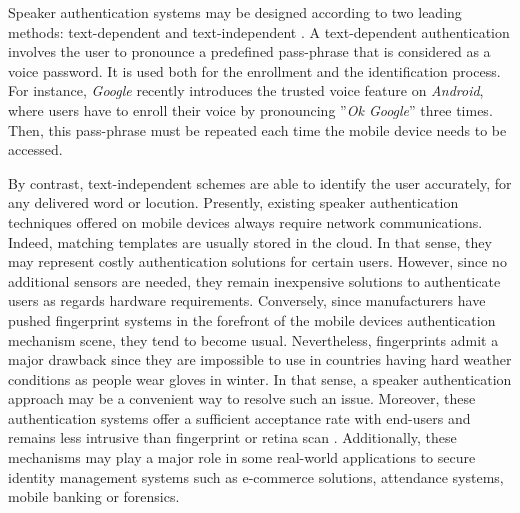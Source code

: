 \documentclass[cryptography,article,submit,moreauthors,pdftex,10pt,a4paper]{mdpi}
\begin{document}
Speaker authentication systems may be designed according to two leading methods: text-dependent and text-independent \cite{15,16}. A text-dependent authentication involves the user to pronounce a predefined pass-phrase that is considered as a voice password. It is used both for the enrollment and the identification process. For instance, \textit{Google} recently introduces the trusted voice feature on \textit{Android}, where users have to enroll their voice by pronouncing ''\textit{Ok Google}'' three times. Then, this pass-phrase must be repeated each time the mobile device needs to be accessed. 

By contrast, text-independent schemes are able to identify the user accurately, for any delivered word or locution. Presently, existing speaker authentication techniques offered on mobile devices always require network communications. Indeed, matching templates are usually stored in the cloud. In that sense, they may represent costly authentication solutions for certain users. However, since no additional sensors are needed, they remain inexpensive solutions to authenticate users as regards hardware requirements. Conversely, since manufacturers have pushed fingerprint systems in the forefront of the mobile devices authentication mechanism scene, they tend to become usual. Nevertheless, fingerprints admit a major drawback since they are impossible to use in countries having hard weather conditions as people wear gloves in winter. In that sense, a speaker authentication approach may be a convenient way to resolve such an issue. Moreover, these authentication systems offer a sufficient acceptance rate with end-users and remains less intrusive than fingerprint or retina scan \cite{8,17}. Additionally, these mechanisms may play a major role in some real-world applications to secure identity management systems such as e-commerce solutions, attendance systems, mobile banking or forensics.
\end{document}
